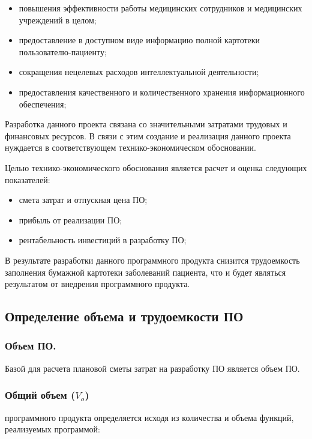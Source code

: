 \begin{itemize}
  \item повышения эффективности работы медицинских сотрудников и медицинских учреждений в целом;
  \item предоставление в доступном виде информацию полной картотеки пользователю-пациенту;
  \item сокращения нецелевых расходов интеллектуальной деятельности;
  \item предоставления качественного и количественного хранения информационного обеспечения;
\end{itemize}

Разработка данного проекта связана со значительными затратами трудовых и финансовых ресурсов. В связи с этим создание и реализация данного проекта нуждается в соответствующем технико-экономическом обосновании.

Целью технико-экономического обоснования является расчет и оценка следующих показателей:

\begin{itemize}
  \item смета затрат и отпускная цена ПО;
  \item прибыль от реализации ПО;
  \item рентабельность инвестиций в разработку ПО;
\end{itemize}

В результате разработки данного программного продукта снизится трудоемкость заполнения бумажной картотеки заболеваний пациента, что и будет являться результатом от внедрения программного продукта.

\subsection{Определение объема и трудоемкости ПО }

\subsubsection{Объем ПО. }

Базой для расчета плановой сметы затрат на разработку ПО является объем ПО.   

\subsubsection{Общий объем ($ V_{o} $)  }
программного продукта определяется исходя из количества и объема функций, реализуемых программой:

